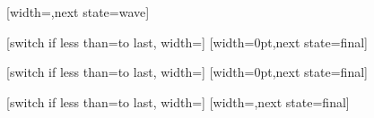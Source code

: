{
  [width=\pgfsnakesegmentlength,next state=wave]
  {}

  [switch if less than=\pgfsnakesegmentlength to last,
               width=\pgfsnakesegmentlength]
  {
    \pgfpathmoveto{
      \pgfpointadd
      {\pgfpoint{-\pgfsnakecompleteddistance}{0pt}}%
      {\pgfpointpolar{\pgfsnakesegmentangle}{\pgfsnakecompleteddistance}}}%
    \pgfpatharc{\pgfsnakesegmentangle}{-\pgfsnakesegmentangle}{\pgfsnakecompleteddistance}%
  }
  [width=0pt,next state=final]
  {
    \pgfpathmoveto{
      \pgfpointadd
      {\pgfpoint{-\pgfsnakecompleteddistance}{0pt}}%
      {\pgfpointpolar{\pgfsnakesegmentangle}{\pgfsnakecompleteddistance}}}%
    \pgfpatharc{\pgfsnakesegmentangle}{-\pgfsnakesegmentangle}{\pgfsnakecompleteddistance}%
  }
  {
    \pgfpathmoveto{\pgfpoint{\pgfsnakeremainingdistance}{0pt}}
  }
}



%

{
  [switch if less than=\pgfsnakesegmentlength to last,
               width=\pgfsnakesegmentlength]
  {
    \pgftransformxshift{\pgfsnakesegmentlength}
    \pgfpathmoveto{
      \pgfpointadd
      {\pgfpoint{-\pgfsnakesegmentobjectlength}{0pt}}%
      {\pgfpointpolar{\pgfsnakesegmentangle}{\pgfsnakesegmentobjectlength}}}%
    \pgfpatharc{\pgfsnakesegmentangle}{-\pgfsnakesegmentangle}{\pgfsnakesegmentobjectlength}%
  }
  [width=0pt,next state=final]
  {
    \pgftransformxshift{\pgfsnakesegmentlength}
    \pgfpathmoveto{
      \pgfpointadd
      {\pgfpoint{-\pgfsnakesegmentobjectlength}{0pt}}%
      {\pgfpointpolar{\pgfsnakesegmentangle}{\pgfsnakesegmentobjectlength}}}%
    \pgfpatharc{\pgfsnakesegmentangle}{-\pgfsnakesegmentangle}{\pgfsnakesegmentobjectlength}%
  }
  {
    \pgfpathmoveto{\pgfpoint{\pgfsnakeremainingdistance}{0pt}}
  }
}


%

{
  [switch if less than=\pgfsnakesegmentlength to last,
                   width=\pgfsnakesegmentlength]
  {
    \pgfpathmoveto{\pgfpoint{0pt}{\pgfsnakesegmentamplitude}}
    \pgfpathlineto{\pgfpoint{\pgfsnakesegmentobjectlength}{0pt}}
    \pgfpathlineto{\pgfpoint{0pt}{-\pgfsnakesegmentamplitude}}
    \pgfpathclose
  }
  [width=\pgfsnakesegmentobjectlength,next state=final]
  {
    \pgfpathmoveto{\pgfpoint{0pt}{\pgfsnakesegmentamplitude}}
    \pgfpathlineto{\pgfpoint{\pgfsnakesegmentobjectlength}{0pt}}
    \pgfpathlineto{\pgfpoint{0pt}{-\pgfsnakesegmentamplitude}}
    \pgfpathclose
  }
  {
    \pgfpathmoveto{\pgfpoint{\pgfsnakeremainingdistance}{0pt}}
  }
}



